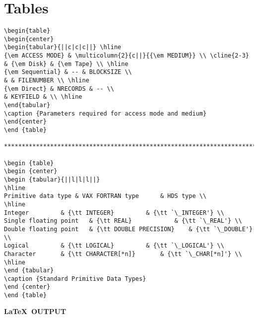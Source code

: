 \newpage

\section{Tables}

\begin{verbatim}
\begin{table}
\begin{center}
\begin{tabular}{||c|c|c||} \hline
{\em ACCESS MODE} & \multicolumn{2}{c||}{{\em MEDIUM}} \\ \cline{2-3}
& {\em Disk} & {\em Tape} \\ \hline
{\em Sequential} & -- & BLOCKSIZE \\
& & FILENUMBER \\ \hline
{\em Direct} & NRECORDS & -- \\
& KEYFIELD & \\ \hline
\end{tabular}
\caption {Parameters required for access mode and medium}
\end{center}
\end {table}

********************************************************************************

\begin {table}
\begin {center}
\begin {tabular}{||l|l|l||}
\hline
Primitive data type	& VAX FORTRAN type		& HDS type \\
\hline
Integer			& {\tt INTEGER}			& {\tt `\_INTEGER'} \\
Single floating point	& {\tt REAL}			& {\tt `\_REAL'} \\
Double floating point	& {\tt DOUBLE PRECISION}	& {\tt `\_DOUBLE'} \\
Logical			& {\tt LOGICAL}			& {\tt `\_LOGICAL'} \\
Character		& {\tt CHARACTER[*n]}		& {\tt `\_CHAR[*n]'} \\
\hline
\end {tabular}
\caption {Standard Primitive Data Types}
\end {center}
\end {table}
\end{verbatim}

\newpage

\begin{center}
{\bf \LaTeX\ OUTPUT}
\end{center}

